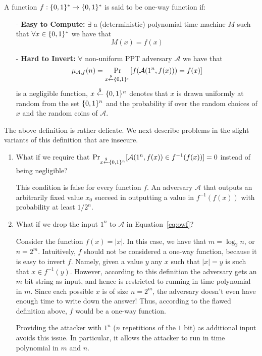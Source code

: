 \begin{tcolorbox}[colback=red!5!white]
\begin{definition}
A function $f : \{ 0, 1 \}^{*} \rightarrow \{ 0, 1 \}^{*}$ is said to be one-way function if:
\begin{itemize}
\item[-] \textbf{Easy to Compute:} $\exists$ a (deterministic) polynomial time machine $M$ such that $\forall x \in \{ 0, 1 \}^{*}$ we have that \[M(x) = f(x)\]
\item[-] \textbf{Hard to Invert:} $\forall$ non-uniform PPT adversary $\mathcal{A}$ we have that
    \begin{equation}\label{eq:owf}
    \mu_{\mathcal{A},f}(n) = \Pr_{x \stackrel{\$}{\leftarrow} \{ 0, 1 \}^{n}}[ f(\mathcal{A}(1^n, f(x))) = f(x)]
     \end{equation}
     is a negligible function,  $x \overset{\$}{\leftarrow} \{ 0, 1 \}^{n}$ denotes that $x$ is drawn uniformly at random from the set $\{ 0, 1 \}^{n}$ and the probability if over the random choices of $x$ and the random coins of $\mathcal{A}$.
\end{itemize}
\end{definition}
\end{tcolorbox}

The above definition is rather delicate. We next describe problems in the slight variants of this definition that are insecure.

\begin{enumerate}
\item What if we require that
    $\Pr_{x \stackrel{\$}{\leftarrow} \{ 0, 1 \}^{n}}[ \mathcal{A}(1^n, f(x)) \in f^{-1}(f(x))] = 0$ instead of being negligible?

This condition is false for every function $f$. An adversary $\mathcal{A}$ that outputs an arbitrarily fixed value $x_0$  succeed in outputting a value in $f^{-1}(f(x))$ with probability at least $1/2^{n}$.

\item  What if we drop the input $1^n$ to $\mathcal{A}$ in Equation~\ref{eq:owf}?

Consider the function $f(x) = |x|$.  In this case, we have that $m = \log_2 n$, or $n = 2^m$.  Intuitively, $f$ should not be considered a one-way function, because it is easy to invert $f$. Namely, given a value $y$ any $x$ such that $|x| = y$ is such that $x \in f^{-1}(y)$.  However, according to this definition the adversary gets an $m$ bit string as input, and hence is restricted to running in time polynomial in $m$. Since each possible $x$ is of size $n = 2^m$, the adversary doesn't even have enough time to write down the answer!  Thus, according to the flawed definition above, $f$ would be a one-way function.

Providing the attacker with $1^n$ ($n$ repetitions of the $1$ bit) as additional input avoids this issue.  In particular, it allows the attacker to run in time polynomial in $m$ and $n$.
\end{enumerate}

